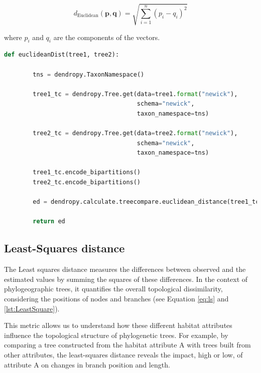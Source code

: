 \begin{equation}\label{eq:euclidean}
    d_{\text{Euclidean}}(\mathbf{p}, \mathbf{q}) = \sqrt{\sum_{i=1}^{n} (p_i - q_i)^2}
\end{equation}

where $p_i$ and $q_i$ are the components of the vectors.

\begin{lstlisting}[label=lst:euclideanDist,language=Python,caption=Python script for calculating the Euclidean distance using the ete3 package in the aPhyloGeo package]
    def euclideanDist(tree1, tree2):
        
        tns = dendropy.TaxonNamespace()
        
        tree1_tc = dendropy.Tree.get(data=tree1.format("newick"), 
                                     schema="newick", 
                                     taxon_namespace=tns)
                                     
        tree2_tc = dendropy.Tree.get(data=tree2.format("newick"), 
                                     schema="newick", 
                                     taxon_namespace=tns)
                                     
        tree1_tc.encode_bipartitions()
        tree2_tc.encode_bipartitions()

        ed = dendropy.calculate.treecompare.euclidean_distance(tree1_tc, tree2_tc)

        return ed
\end{lstlisting}

\subsection{Least-Squares distance}\label{LS}

The Least squares distance measures the differences between observed and the estimated values by summing the squares of these differences. In the context of phylogeographic trees, it quantifies the overall topological dissimilarity, considering the positions of nodes and branches (see Equation \eqref{eq:ls} and \autoref{lst:LeastSquare}).

This metric allows us to understand how these different habitat attributes influence the topological structure of phylogenetic trees. For example, by comparing a tree constructed from the habitat attribute A with trees built from other attributes, the least-squares distance reveals the impact, high or low, of attribute A on changes in branch position and length.

